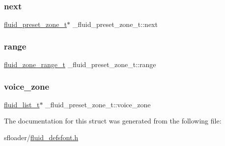 \subsubsection{\texorpdfstring{next}{next}}
{\footnotesize\ttfamily \hyperlink{fluid__defsfont_8h_a74cb7075332911049d39e60df50019b2}{fluid\+\_\+preset\+\_\+zone\+\_\+t}$\ast$ \+\_\+fluid\+\_\+preset\+\_\+zone\+\_\+t\+::next}

\mbox{\label{struct__fluid__preset__zone__t_ace88940d54aefcd8551dfcec08094dc2}} 
\subsubsection{\texorpdfstring{range}{range}}
{\footnotesize\ttfamily \hyperlink{fluidsynth__priv_8h_ac8502f0049ba8c20821b136e611462da}{fluid\+\_\+zone\+\_\+range\+\_\+t} \+\_\+fluid\+\_\+preset\+\_\+zone\+\_\+t\+::range}

\mbox{\label{struct__fluid__preset__zone__t_a2fb65f12d2ae63bade54afe578cbc167}} 
\subsubsection{\texorpdfstring{voice\+\_\+zone}{voice\_zone}}
{\footnotesize\ttfamily \hyperlink{fluid__list_8h_a3ef7535d4290862c0af118569223bd89}{fluid\+\_\+list\+\_\+t}$\ast$ \+\_\+fluid\+\_\+preset\+\_\+zone\+\_\+t\+::voice\+\_\+zone}



The documentation for this struct was generated from the following file\+:\begin{DoxyCompactItemize}
\item 
sfloader/\hyperlink{fluid__defsfont_8h}{fluid\+\_\+defsfont.\+h}\end{DoxyCompactItemize}
